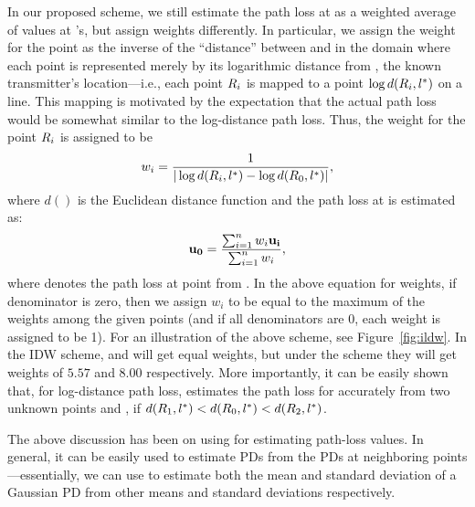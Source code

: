 In our proposed \ildw scheme, we still estimate the path loss at \lz as
a weighted average of values at \li's, but assign weights differently.
In particular, we assign the weight for the point \li as the inverse
of the ``distance'' between \lz and \li in the domain where each point
is represented merely by its logarithmic distance from \lstar, the known
transmitter's location---i.e., each point $R_i$ is mapped to a point
$\log d(R_i, l^*)$ on a line. This mapping is motivated by the
expectation that the actual path loss would be somewhat similar to the
log-distance path loss.
Thus, the weight for the point $R_i$ is assigned to be
$$w_i = \frac{1}{|\log d(R_i, l^*) - \log d(R_0, l^*)|},$$ where $d()$ is the
Euclidean distance function and the path loss at \lz is estimated as:
$$\mathbf{u_0} = \frac{\sum_{i=1}^{n}w_i \mathbf{u_i}}{\sum_{i=1}^{n}w_i},$$ where \ui
denotes the path loss at point \li from \lstar. In the above equation for
weights, if denominator is zero, then we assign $w_i$ to be equal to
the maximum of the weights among the given points (and if all
denominators are 0, each weight is assigned to be 1).
For an illustration of the above scheme, see Figure~\ref{fig:ildw}.
In the IDW scheme, \lo and \lt will get equal weights, but under the
\ildw scheme they will get weights of $5.57$ and $8.00$
respectively. More importantly, it can be easily shown that, for
log-distance path loss, \ildw estimates the path loss for \lz accurately
from two unknown points \lo and \lt, if $d(R_1, l^*) < d(R_0,
l^*) < d(R_2, l^*)$.

The above discussion has been on using \ildw for estimating path-loss
values. In general, it can be easily used to estimate PDs from the PDs
at neighboring points---essentially, we can use \ildw to estimate both
the mean and standard deviation of a Gaussian PD from other means and
standard deviations respectively.


